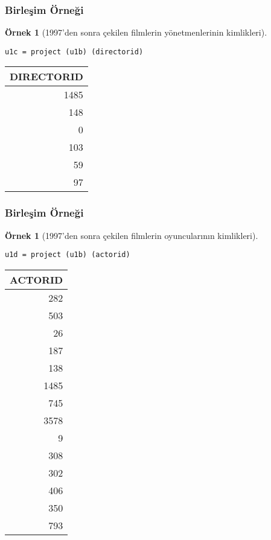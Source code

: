 \documentclass[dvipsnames]{beamer}
\theoremstyle{definition}
\theoremstyle{example}
\newtheorem{ornek}[theorem]{Örnek}
\theoremstyle{plain}
\begin{document}
\begin{frame}[fragile]
  \frametitle{Birleşim Örneği}

  \begin{ornek}[1997'den sonra çekilen filmlerin yönetmenlerinin kimlikleri]
    \begin{lstlisting}
u1c = project (u1b) (directorid)
    \end{lstlisting}

    \pause
    \begin{tiny}
    \begin{table}
      \begin{tabular}{|r|}\hline
DIRECTORID\\\hline\hline
      1485\\\hline
       148\\\hline
         0\\\hline
       103\\\hline
        59\\\hline
        97\\\hline
      \end{tabular}
    \end{table}
    \end{tiny}
  \end{ornek}
\end{frame}

\begin{frame}[fragile]
  \frametitle{Birleşim Örneği}

  \begin{ornek}[1997'den sonra çekilen filmlerin oyuncularının kimlikleri]
    \begin{lstlisting}
u1d = project (u1b) (actorid)
    \end{lstlisting}

    \pause
    \begin{tiny}
    \begin{table}
      \begin{tabular}{|r|}\hline
ACTORID\\\hline\hline
    282\\\hline
    503\\\hline
     26\\\hline
    187\\\hline
    138\\\hline
   1485\\\hline
    745\\\hline
   3578\\\hline
      9\\\hline
    308\\\hline
    302\\\hline
    406\\\hline
    350\\\hline
    793\\\hline
      \end{tabular}
    \end{table}
    \end{tiny}
  \end{ornek}
\end{frame}
\end{document}

